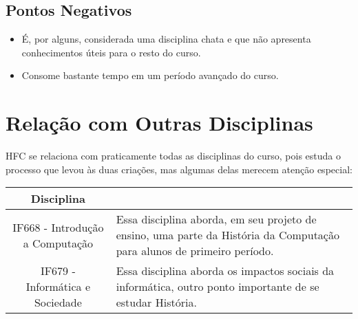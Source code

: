 ﻿\documentclass{article}
\begin{document}
\subsection{Pontos Negativos}

\begin{itemize}
    \item É, por alguns, considerada uma disciplina chata e que não apresenta conhecimentos úteis para o resto do curso.
    \item Consome bastante tempo em um período avançado do curso.
    
\end{itemize}

\section{Relação com Outras Disciplinas}

HFC se relaciona com praticamente todas as disciplinas do curso, pois estuda o processo que levou às duas criações, mas algumas delas merecem atenção especial:

\begin{table}[h]
    \centering
    \begin{tabular}{||c|m{8.5cm}||}
    \hline
     Disciplina & \\
     \hline
     IF668 - Introdução a Computação & Essa disciplina aborda, em seu projeto de ensino, uma parte da História da Computação para alunos de primeiro período. \cite{cinwikiif668}\\
     \hline
     IF679 - Informática e Sociedade & Essa disciplina aborda os impactos sociais da informática, outro ponto importante de se estudar História. \cite{cinwikiif679}\\
     \hline
     
     
        
    \end{tabular}
    
    
    \label{tab:relacoes}
\end{table}



\nocite{*}
\end{document}
